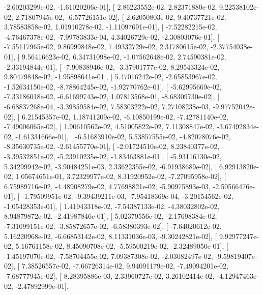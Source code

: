 \documentclass{article}
\begin{document}
         -2.60203299e-02,  -1.61020206e-01],
       [  2.86223552e-02,   2.82371880e-02,   9.22538102e-02,
          2.71807945e-02,  -6.57726151e-02],
       [  2.62050803e-02,   9.40737721e-02,   3.78583858e-02,
          1.01910278e-02,  -1.11097691e-01],
       [ -7.52282215e-02,  -4.76467378e-02,  -7.99783833e-04,
          4.34026729e-02,  -2.30803076e-01],
       [ -7.55117965e-02,   9.86999848e-02,   7.49332729e-02,
          2.31780615e-02,  -2.37754038e-01],
       [  9.56416623e-02,   6.34731098e-02,  -1.07562648e-02,
          2.74590381e-02,  -2.33194844e-01],
       [ -7.90838946e-02,  -3.37901777e-02,   8.29543324e-02,
          9.80479848e-02,  -1.95898641e-01],
       [  5.47016242e-02,  -2.65853967e-02,  -1.52634150e-02,
         -8.78864245e-02,  -1.92770762e-01],
       [ -5.62995669e-02,  -7.33186018e-02,  -6.61699743e-02,
          1.07813568e-01,  -8.68309730e-02],
       [ -6.68837268e-04,  -3.39859584e-02,   7.58303222e-02,
          7.27108238e-03,  -9.97752042e-02],
       [  6.21545357e-02,   1.18741209e-02,  -6.10850199e-02,
         -7.42781140e-02,  -7.49006065e-02],
       [  1.90610562e-02,   4.51005822e-02,   7.11308847e-02,
         -3.67492834e-02,  -1.61331666e-01],
       [ -6.51683910e-02,   5.53857555e-02,  -4.82078076e-02,
         -8.35630735e-02,  -2.61455770e-01],
       [ -2.01724510e-02,   8.23840377e-02,  -3.39532851e-02,
         -5.23910235e-02,  -1.83463881e-01],
       [ -5.93116130e-02,   5.34299942e-02,  -3.90484251e-03,
          2.33622355e-02,  -6.91938689e-02],
       [  6.92913820e-02,   1.05674651e-01,   3.72329977e-02,
          8.31920952e-02,  -7.27095958e-02],
       [  6.75989716e-02,  -4.48908279e-02,   4.77698821e-02,
         -5.90975893e-03,  -2.50566476e-01],
       [ -1.79509951e-02,  -9.39439211e-03,  -7.95418369e-04,
         -3.20154562e-02,  -1.05428353e-01],
       [  1.41943318e-02,  -7.54387133e-02,  -4.38032802e-02,
          8.94879872e-02,  -2.41987846e-01],
       [  5.02379556e-02,  -2.17698384e-02,  -7.31099151e-02,
         -3.85872657e-02,  -6.58380393e-02],
       [ -7.64020612e-02,   5.16220968e-02,  -6.66853142e-02,
          8.11331036e-03,  -9.30242821e-02],
       [  9.92977247e-02,   5.16761158e-02,   8.45090708e-02,
         -5.59500219e-02,  -2.32489050e-01],
       [ -1.45197070e-02,  -7.58704455e-02,   7.09387308e-02,
         -2.03082497e-02,  -9.59819407e-02],
       [  7.38526557e-02,  -7.66726314e-02,   9.94091179e-02,
         -7.49094201e-02,  -7.68777945e-02],
       [  8.28395886e-03,   2.33960727e-02,   3.26102414e-02,
         -4.12947463e-02,  -2.47892999e-01],
\end{document}
